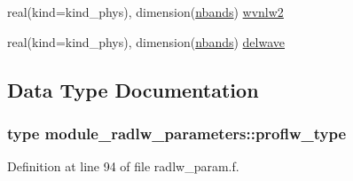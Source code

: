 \begin{DoxyCompactItemize}
\item 
real(kind=kind\+\_\+phys), dimension(\hyperlink{namespacemodule__radlw__parameters_a48e11b992a80595d71c92f7c9bfbe19c}{nbands}) \hyperlink{namespacemodule__radlw__parameters_ace30abd03d144096ee6b444b46081b58}{wvnlw2}
\item 
real(kind=kind\+\_\+phys), dimension(\hyperlink{namespacemodule__radlw__parameters_a48e11b992a80595d71c92f7c9bfbe19c}{nbands}) \hyperlink{namespacemodule__radlw__parameters_a6ad1dff8ffc039d03c5cf3059344308e}{delwave}
\end{DoxyCompactItemize}


\subsection{Data Type Documentation}
\label{structmodule__radlw__parameters_1_1proflw__type}
\hypertarget{namespacemodule__radlw__parameters_structmodule__radlw__parameters_1_1proflw__type}{}
\subsubsection{type module\+\_\+radlw\+\_\+parameters\+:\+:proflw\+\_\+type}


Definition at line 94 of file radlw\+\_\+param.\+f.



